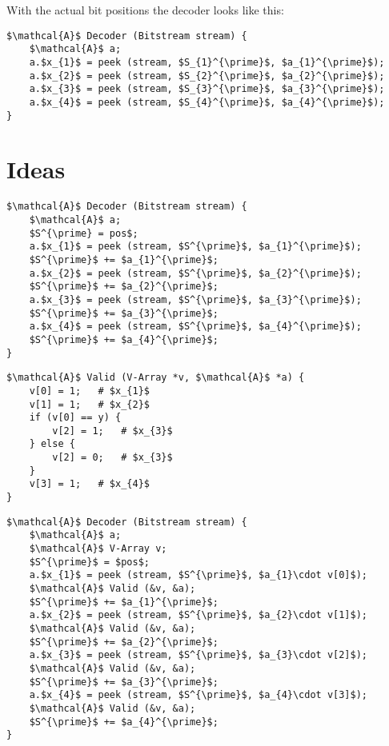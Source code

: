 \documentclass[parskip=half,paper=a4,DIV=13]{scrartcl}
\begin{document}
With the actual bit positions the decoder looks like this:
\begin{lstlisting}[mathescape]
$\mathcal{A}$ Decoder (Bitstream stream) {
	$\mathcal{A}$ a;
	a.$x_{1}$ = peek (stream, $S_{1}^{\prime}$, $a_{1}^{\prime}$);
	a.$x_{2}$ = peek (stream, $S_{2}^{\prime}$, $a_{2}^{\prime}$);
	a.$x_{3}$ = peek (stream, $S_{3}^{\prime}$, $a_{3}^{\prime}$);
	a.$x_{4}$ = peek (stream, $S_{4}^{\prime}$, $a_{4}^{\prime}$);
}
\end{lstlisting}

\section{Ideas}

\begin{lstlisting}[mathescape]
$\mathcal{A}$ Decoder (Bitstream stream) {
	$\mathcal{A}$ a;
	$S^{\prime} = pos$;
	a.$x_{1}$ = peek (stream, $S^{\prime}$, $a_{1}^{\prime}$);
	$S^{\prime}$ += $a_{1}^{\prime}$;
	a.$x_{2}$ = peek (stream, $S^{\prime}$, $a_{2}^{\prime}$);
	$S^{\prime}$ += $a_{2}^{\prime}$;
	a.$x_{3}$ = peek (stream, $S^{\prime}$, $a_{3}^{\prime}$);
	$S^{\prime}$ += $a_{3}^{\prime}$;
	a.$x_{4}$ = peek (stream, $S^{\prime}$, $a_{4}^{\prime}$);
	$S^{\prime}$ += $a_{4}^{\prime}$;
}
\end{lstlisting}

\begin{lstlisting}[mathescape]
$\mathcal{A}$ Valid (V-Array *v, $\mathcal{A}$ *a) {
	v[0] = 1;	# $x_{1}$
	v[1] = 1;	# $x_{2}$
	if (v[0] == y) {
		v[2] = 1;	# $x_{3}$
	} else {
		v[2] = 0;	# $x_{3}$
	}
	v[3] = 1;	# $x_{4}$
}
\end{lstlisting}

\begin{lstlisting}[mathescape]
$\mathcal{A}$ Decoder (Bitstream stream) {
	$\mathcal{A}$ a;
	$\mathcal{A}$ V-Array v;
	$S^{\prime}$ = $pos$;
	a.$x_{1}$ = peek (stream, $S^{\prime}$, $a_{1}\cdot v[0]$);
	$\mathcal{A}$ Valid (&v, &a);
	$S^{\prime}$ += $a_{1}^{\prime}$;
	a.$x_{2}$ = peek (stream, $S^{\prime}$, $a_{2}\cdot v[1]$);
	$\mathcal{A}$ Valid (&v, &a);
	$S^{\prime}$ += $a_{2}^{\prime}$;
	a.$x_{3}$ = peek (stream, $S^{\prime}$, $a_{3}\cdot v[2]$);
	$\mathcal{A}$ Valid (&v, &a);
	$S^{\prime}$ += $a_{3}^{\prime}$;
	a.$x_{4}$ = peek (stream, $S^{\prime}$, $a_{4}\cdot v[3]$);
	$\mathcal{A}$ Valid (&v, &a);
	$S^{\prime}$ += $a_{4}^{\prime}$;
}
\end{lstlisting}
\end{document}
